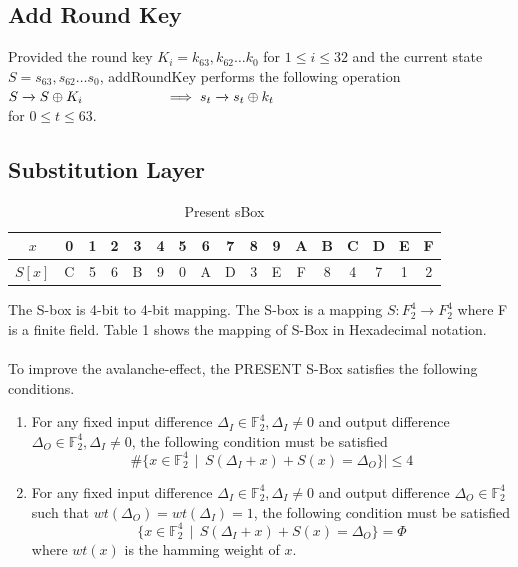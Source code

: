 \documentclass[journal=tosc,preprint]{iacrtrans}
\begin{document}
\subsection{Add Round Key}
Provided the round key $K_i = k_{63},k_{62} \dots k_0$ for $1\leq i \leq 32$ and the current state $S = s_{63},s_{62}\dots s_0$, addRoundKey performs the following operation\\
\hspace*{30mm}$
	S \xrightarrow{} S \oplus K_i \\
\hspace*{20mm}	\implies s_t \xrightarrow[]{} s_t \oplus k_t 
$\\
for $0\leq t\leq 63$.
\subsection{Substitution Layer}
\begin{table}[h!]
\caption{Present sBox}
\centering
\begin{tabular}{ |c||c|c|c|c|c|c|c|c|c|c|c|c|c|c|c|c| }
		\hline
		$x$ & 0 & 1 & 2 & 3&4& 5& 6&7&8&9&A&B&C&D&E&F  \\ \hline
		$S[x]$& C & 5 & 6& B &9 &0 &A &D& 3& E &F& 8& 4 &7& 1& 2 \\ \hline
\end{tabular}
\end{table}
The S-box is 4-bit to 4-bit mapping. The S-box is a mapping $S:F_2^4 \rightarrow F_2^4$ where F is a finite field. Table 1 shows the mapping of S-Box in
 Hexadecimal notation.
\\\\
To improve the avalanche-effect, the PRESENT S-Box satisfies the following conditions.\\
\begin{enumerate}
	\item For any fixed input difference $\Delta_I \in \mathbb{F}_2^4,\Delta_I \not = 0$ and output difference $\Delta_O \in \mathbb{F}_2^4,\Delta_I \not = 0$, the following condition must be satisfied
	\begin{equation*}
	\#\{ x \in \mathbb{F}_2^4~~ \vert~~ S(\Delta_I +x) + S(x) = \Delta_O \}| \leq 4
	\end{equation*}
	\item For any fixed input difference $\Delta_I \in \mathbb{F}_2^4,\Delta_I \not = 0$ and output difference $\Delta_O \in \mathbb{F}_2^4$ such that $wt(\Delta_O) = wt(\Delta_I) = 1$, the following condition must be satisfied
	\begin{equation*}
	\{ x \in \mathbb{F}_2^4~~ \vert~~  S(\Delta_I +x) + S(x) = \Delta_O  \} = \Phi
	\end{equation*}
	where $wt(x)$ is the hamming weight of $x$.
\end{enumerate}
\end{document}
